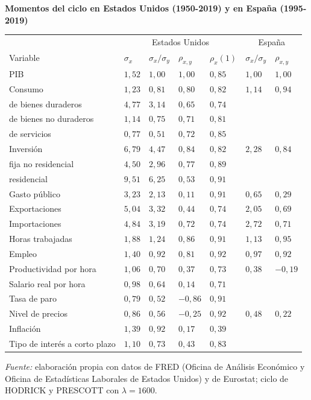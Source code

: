 \documentclass[10pt,a4paper]{article}
\begin{document}
\begin{center}\begin{minipage}{\linewidth}\centering
{\small\textbf{Momentos del ciclo en Estados Unidos (1950-2019) y en España (1995-2019)}}\par\vspace{0.4em}
{\footnotesize
\begin{tabular}{p{4.3cm}p{1.15cm}p{1.15cm}p{1.15cm}p{1.15cm}p{1.15cm}p{1.15cm}}
\hline
 & \multicolumn{4}{c}{Estados Unidos} & \multicolumn{2}{c}{España}\tabularnewline
Variable & $\sigma_x$ & $\sigma_x/\sigma_y$ & $\rho_{x,y}$ & $\rho_x(1)$ & $\sigma_x/\sigma_y$ & $\rho_{x,y}$\tabularnewline
\hline
PIB & $1{,}52$ & $1{,}00$ & $1{,}00$ & $0{,}85$ & $1{,}00$ & $1{,}00$\tabularnewline
Consumo & $1{,}23$ & $0{,}81$ & $0{,}80$ & $0{,}82$ & $1{,}14$ & $0{,}94$\tabularnewline
\quad de bienes duraderos & $4{,}77$ & $3{,}14$ & $0{,}65$ & $0{,}74$ & & \tabularnewline
\quad de bienes no duraderos & $1{,}14$ & $0{,}75$ & $0{,}71$ & $0{,}81$ & & \tabularnewline
\quad de servicios & $0{,}77$ & $0{,}51$ & $0{,}72$ & $0{,}85$ & & \tabularnewline
Inversión & $6{,}79$ & $4{,}47$ & $0{,}84$ & $0{,}82$ & $2{,}28$ & $0{,}84$\tabularnewline
\quad fija no residencial & $4{,}50$ & $2{,}96$ & $0{,}77$ & $0{,}89$ & & \tabularnewline
\quad residencial & $9{,}51$ & $6{,}25$ & $0{,}53$ & $0{,}91$ & & \tabularnewline
Gasto público & $3{,}23$ & $2{,}13$ & $0{,}11$ & $0{,}91$ & $0{,}65$ & $0{,}29$\tabularnewline
Exportaciones & $5{,}04$ & $3{,}32$ & $0{,}44$ & $0{,}74$ & $2{,}05$ & $0{,}69$\tabularnewline
Importaciones & $4{,}84$ & $3{,}19$ & $0{,}72$ & $0{,}74$ & $2{,}72$ & $0{,}71$\tabularnewline
Horas trabajadas & $1{,}88$ & $1{,}24$ & $0{,}86$ & $0{,}91$ & $1{,}13$ & $0{,}95$\tabularnewline
Empleo & $1{,}40$ & $0{,}92$ & $0{,}81$ & $0{,}92$ & $0{,}97$ & $0{,}92$\tabularnewline
Productividad por hora & $1{,}06$ & $0{,}70$ & $0{,}37$ & $0{,}73$ & $0{,}38$ & $-0{,}19$\tabularnewline
Salario real por hora & $0{,}98$ & $0{,}64$ & $0{,}14$ & $0{,}71$ & & \tabularnewline
Tasa de paro & $0{,}79$ & $0{,}52$ & $-0{,}86$ & $0{,}91$ & & \tabularnewline
Nivel de precios & $0{,}86$ & $0{,}56$ & $-0{,}25$ & $0{,}92$ & $0{,}48$ & $0{,}22$\tabularnewline
Inflación & $1{,}39$ & $0{,}92$ & $0{,}17$ & $0{,}39$ & & \tabularnewline
Tipo de interés a corto plazo & $1{,}10$ & $0{,}73$ & $0{,}43$ & $0{,}83$ & & \tabularnewline
\hline
\end{tabular}}\par\vspace{0.4em}
{\small\textit{Fuente: }elaboración propia con datos de FRED (Oficina de Análisis Económico y Oficina de Estadísticas Laborales de Estados Unidos) y de Eurostat; ciclo de HODRICK y PRESCOTT con $\lambda=1600$.}
\end{minipage}\end{center}
\end{document}
